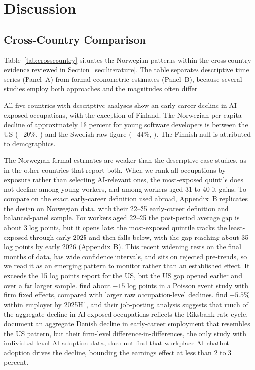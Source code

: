 \documentclass[12pt]{article}
\begin{document}
\section{Discussion}\label{sec:discussion}

\subsection{Cross-Country Comparison}\label{sec:discussion:crosscountry}

Table~\ref{tab:crosscountry} situates the Norwegian patterns within the cross-country evidence reviewed in Section~\ref{sec:literature}. The table separates descriptive time series (Panel~A) from formal econometric estimates (Panel~B), because several studies employ both approaches and the magnitudes often differ.

All five countries with descriptive analyses show an early-career decline in AI-exposed occupations, with the exception of Finland. The Norwegian per-capita decline of approximately 18 percent for young software developers is between the US ($-20\%$, \citealp{brynjolfsson2025}) and the Swedish raw figure ($-44\%$, \citealp{lodefalk2026}). The Finnish null \citep{kauhanen2026} is attributed to demographics.

The Norwegian formal estimates are weaker than the descriptive case studies, as in the other countries that report both. When we rank all occupations by exposure rather than selecting AI-relevant ones, the most-exposed quintile does not decline among young workers, and among workers aged 31 to 40 it gains. To compare on the exact early-career definition used abroad, Appendix~B replicates the \citet{brynjolfsson2025} design on Norwegian data, with their 22--25 early-career definition and balanced-panel sample. For workers aged 22--25 the post-period average gap is about 3 log points, but it opens late: the most-exposed quintile tracks the least-exposed through early 2025 and then falls below, with the gap reaching about 35 log points by early 2026 (Appendix~B). This recent widening rests on the final months of data, has wide confidence intervals, and sits on rejected pre-trends, so we read it as an emerging pattern to monitor rather than an established effect. It exceeds the 15 log points \citet{brynjolfsson2025} report for the US, but the US gap opened earlier and over a far larger sample. \citet{brynjolfsson2025} find about $-15$ log points in a Poisson event study with firm fixed effects, compared with larger raw occupation-level declines. \citet{lodefalk2026} find $-5.5\%$ within employer by 2025H1, and their job-posting analysis suggests that much of the aggregate decline in AI-exposed occupations reflects the Riksbank rate cycle. \citet{humlum2026} document an aggregate Danish decline in early-career employment that resembles the US pattern, but their firm-level difference-in-differences, the only study with individual-level AI adoption data, does not find that workplace AI chatbot adoption drives the decline, bounding the earnings effect at less than 2 to 3 percent.
\end{document}
